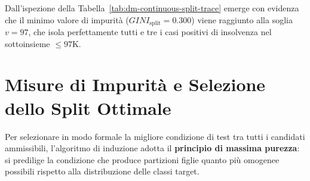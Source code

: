 \begin{table}[H]
\centering
\caption{Calcolo incrementale dell'indice di Gini sulle soglie candidate per l'attributo Annual Income.}
\label{tab:dm-continuous-split-trace}
\vspace{2mm}
\end{table}

Dall'ispezione della Tabella~\ref{tab:dm-continuous-split-trace} emerge con evidenza che il minimo valore di impurità ($GINI_{\text{split}} = 0.300$) viene raggiunto alla soglia $v = 97$, che isola perfettamente tutti e tre i casi positivi di insolvenza nel sottoinsieme $\le 97\text{K}$.

\FloatBarrier
\section{Misure di Impurità e Selezione dello Split Ottimale}
\label{sec:dm-impurity-measures}

Per selezionare in modo formale la migliore condizione di test tra tutti i candidati ammissibili, l'algoritmo di induzione adotta il \textbf{principio di massima purezza}: si predilige la condizione che produce partizioni figlie quanto più omogenee possibili rispetto alla distribuzione delle classi target.

